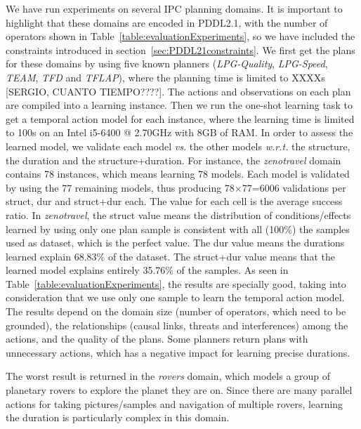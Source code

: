 \documentclass[runningheads]{llncs}
\begin{document}
We have run experiments on several IPC planning domains. It is important to highlight that these domains are encoded in PDDL2.1, with the number of operators shown in Table~\ref{table:evaluationExperiments}, so we have included the constraints introduced in section~\ref{sec:PDDL21constraints}. We first get the plans for these domains by using five known planners (\textit{LPG-Quality}, \textit{LPG-Speed}, \textit{TEAM}, \textit{TFD} and \textit{TFLAP}), where the planning time is limited to XXXXs [SERGIO, CUANTO TIEMPO????]. The actions and observations on each plan are compiled into a learning instance. Then
we run the one-shot learning task to get a temporal action model for each instance, where the learning time is limited to 100s on an Intel i5-6400 @ 2.70GHz with 8GB of RAM.
In order to assess the learned model, we validate each model \emph{vs.} the other models \emph{w.r.t.} the structure, the duration and the structure+duration.
For instance, the \emph{zenotravel} domain contains 78 instances, which means learning 78 models. Each model is validated by using the 77 remaining models, thus producing 78$\times$77=6006 validations per struct, dur and struct+dur each. The value for each cell is the average success ratio.
In \emph{zenotravel}, the struct value means the distribution of conditions/effects learned by using only one plan sample is consistent with all (100\%) the samples used as dataset, which is the perfect value.
The dur value means the durations learned explain 68.83\% of the dataset. The struct+dur value means that the learned model explains entirely 35.76\% of the samples.
As seen in Table~\ref{table:evaluationExperiments}, the results are specially good, taking into consideration that we use only one sample to learn the temporal action model.
The results depend on the domain size (number of operators, which need to be grounded), the relationships (causal links, threats and interferences) among the actions, and the quality of the plans. 
Some planners return plans with unnecessary actions, which has a negative impact for learning precise durations.




The worst result is returned in the \emph{rovers} domain, which models a group of planetary rovers to explore the planet they are on. Since there are many parallel actions for taking pictures/samples and navigation of multiple rovers, learning the duration is particularly complex in this domain.
\end{document}
